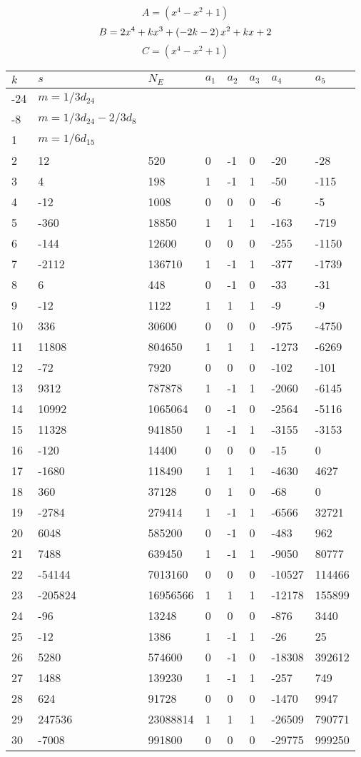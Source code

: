 \documentclass{amsart}
\begin{document}
$$A=(x^4
 - x^2
 + 1)$$
$$B=2\*x^4
 + k\*x^3
 + \left(-2\*k
 - 2\right) \*x^2
 + k\*x
 + 2$$
$$C=(x^4
 - x^2
 + 1)$$
\begin{longtable}{|l|l|l|lllll|}
\hline
$k$ & $s$ & $N_E$ & $a_1$ & $a_2$ & $a_3$ & $a_4$ & $a_5$\\
\hline
-24&$m=1/3d_{24}$&&\multicolumn{5}{c|}{}\\
-8&$m=1/3d_{24}-2/3d_{8}$&&\multicolumn{5}{c|}{}\\
1&$m=1/6d_{15}$&&\multicolumn{5}{c|}{}\\
2&12&520&0&-1&0&-20&-28\\
3&4&198&1&-1&1&-50&-115\\
4&-12&1008&0&0&0&-6&-5\\
5&-360&18850&1&1&1&-163&-719\\
6&-144&12600&0&0&0&-255&-1150\\
7&-2112&136710&1&-1&1&-377&-1739\\
8&6&448&0&-1&0&-33&-31\\
9&-12&1122&1&1&1&-9&-9\\
10&336&30600&0&0&0&-975&-4750\\
11&11808&804650&1&1&1&-1273&-6269\\
12&-72&7920&0&0&0&-102&-101\\
13&9312&787878&1&-1&1&-2060&-6145\\
14&10992&1065064&0&-1&0&-2564&-5116\\
15&11328&941850&1&-1&1&-3155&-3153\\
16&-120&14400&0&0&0&-15&0\\
17&-1680&118490&1&1&1&-4630&4627\\
18&360&37128&0&1&0&-68&0\\
19&-2784&279414&1&-1&1&-6566&32721\\
20&6048&585200&0&-1&0&-483&962\\
21&7488&639450&1&-1&1&-9050&80777\\
22&-54144&7013160&0&0&0&-10527&114466\\
23&-205824&16956566&1&1&1&-12178&155899\\
24&-96&13248&0&0&0&-876&3440\\
25&-12&1386&1&-1&1&-26&25\\
26&5280&574600&0&-1&0&-18308&392612\\
27&1488&139230&1&-1&1&-257&749\\
28&624&91728&0&0&0&-1470&9947\\
29&247536&23088814&1&1&1&-26509&790771\\
30&-7008&991800&0&0&0&-29775&999250\\

\end{longtable}
\end{document}
